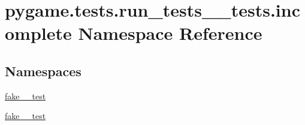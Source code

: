 \hypertarget{namespacepygame_1_1tests_1_1run__tests____tests_1_1incomplete}{}\section{pygame.\+tests.\+run\+\_\+tests\+\_\+\+\_\+tests.\+incomplete Namespace Reference}
\label{namespacepygame_1_1tests_1_1run__tests____tests_1_1incomplete}
\subsection*{Namespaces}
\begin{DoxyCompactItemize}
\item 
 \hyperlink{namespacepygame_1_1tests_1_1run__tests____tests_1_1incomplete_1_1fake__2__test}{fake\+\_\+\_\+test}
\item 
 \hyperlink{namespacepygame_1_1tests_1_1run__tests____tests_1_1incomplete_1_1fake__3__test}{fake\+\_\+\_\+test}
\end{DoxyCompactItemize}
